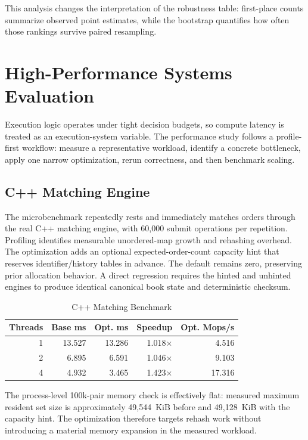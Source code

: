 \documentclass[journal,10pt]{IEEEtran}
\newcommand{\1}{\mathbf{1}}
\begin{document}
This analysis changes the interpretation of the robustness table: first-place counts summarize observed point estimates, while the bootstrap quantifies how often those rankings survive paired resampling.

\section{High-Performance Systems Evaluation}
\label{sec:performance}
Execution logic operates under tight decision budgets, so compute latency is treated as an execution-system variable. The performance study follows a profile-first workflow: measure a representative workload, identify a concrete bottleneck, apply one narrow optimization, rerun correctness, and then benchmark scaling.

\subsection{C++ Matching Engine}
The microbenchmark repeatedly rests and immediately matches orders through the real C++ matching engine, with 60,000 submit operations per repetition. Profiling identifies measurable unordered-map growth and rehashing overhead. The optimization adds an optional expected-order-count capacity hint that reserves identifier/history tables in advance. The default remains zero, preserving prior allocation behavior. A direct regression requires the hinted and unhinted engines to produce identical canonical book state and deterministic checksum.

\begin{table}[t]
\centering
\caption{C++ Matching Benchmark}
\label{tab:cpp-perf}
\begin{tabular}{rrrrr}
\toprule
Threads & Base ms & Opt. ms & Speedup & Opt. Mops/s \\
\midrule
1 & 13.527 & 13.286 & 1.018$\times$ & 4.516 \\
2 & 6.895 & 6.591 & 1.046$\times$ & 9.103 \\
4 & 4.932 & 3.465 & 1.423$\times$ & 17.316 \\
\bottomrule
\end{tabular}
\end{table}
The process-level 100k-pair memory check is effectively flat: measured maximum resident set size is approximately 49,544~KiB before and 49,128~KiB with the capacity hint. The optimization therefore targets rehash work without introducing a material memory expansion in the measured workload.
\end{document}
